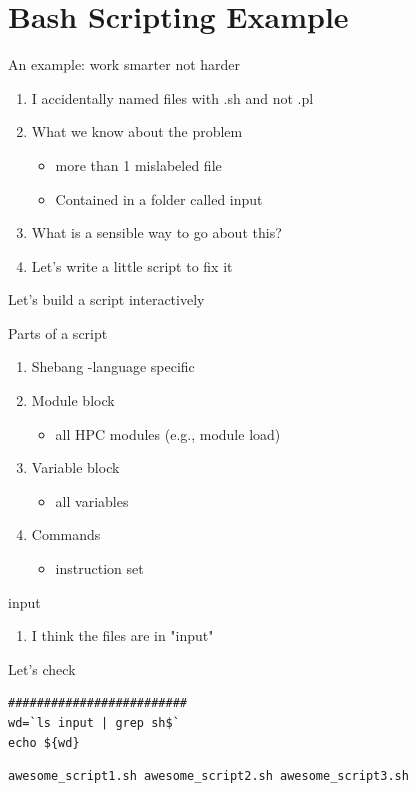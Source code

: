 \documentclass[t,10pt]{beamer}
\begin{document}
\section{Bash Scripting Example}
\label{sec:orgheadline26}
\begin{frame}[label={sec:orgheadline17}]{An example: work smarter not harder}
\begin{enumerate}[<+->]
\item I accidentally named files with \alert{.sh} and not \alert{.pl}
\item What we know about the problem
\begin{itemize}
\item more than 1 mislabeled file
\item Contained in a folder called input
\end{itemize}
\item What is a sensible way to go about this?
\item Let's write a little script to fix it
\end{enumerate}
\end{frame}

\begin{frame}[label={sec:orgheadline18}]{Let's build a script interactively}
\begin{block}{Parts of a script}
\begin{enumerate}[<+->]
\item Shebang
-language specific
\item Module block
\begin{itemize}
\item all HPC modules (e.g., module load)
\end{itemize}
\item Variable block
\begin{itemize}
\item all variables
\end{itemize}
\item Commands
\begin{itemize}
\item instruction set
\end{itemize}
\end{enumerate}
\end{block}
\end{frame}

\begin{frame}[fragile,label={sec:orgheadline19}]{input}
 \begin{enumerate}
\item I think the files are in "input"
\end{enumerate}
\begin{block}{Let's check}
\lstset{language=sh,label= ,caption= ,captionpos=b,numbers=none}
\begin{lstlisting}
#########################
wd=`ls input | grep sh$`
echo ${wd}
\end{lstlisting}

\begin{verbatim}
awesome_script1.sh awesome_script2.sh awesome_script3.sh
\end{verbatim}
\end{block}
\end{frame}
\end{document}

